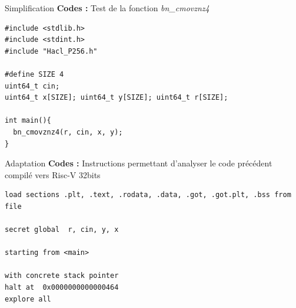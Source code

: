 \documentclass{backend/backend}
\begin{document}
\begin{frame}[fragile]{Simplification}
\textbf{Codes :} Test de la fonction \textit{bn\_cmovznz4}
    
\begin{verbatim}
#include <stdlib.h>
#include <stdint.h>
#include "Hacl_P256.h"

#define SIZE 4
uint64_t cin;
uint64_t x[SIZE]; uint64_t y[SIZE]; uint64_t r[SIZE];

int main(){
  bn_cmovznz4(r, cin, x, y);
}
\end{verbatim}

\end{frame}

\begin{frame}[fragile]{Adaptation}
    \textbf{Codes :} Instructions permettant d'analyser le code précédent compilé vers Risc-V 32bits
    
    \begin{verbatim}
load sections .plt, .text, .rodata, .data, .got, .got.plt, .bss from file

secret global  r, cin, y, x

starting from <main>

with concrete stack pointer
halt at  0x0000000000000464
explore all

\end{verbatim}
\end{frame}
\end{document}

